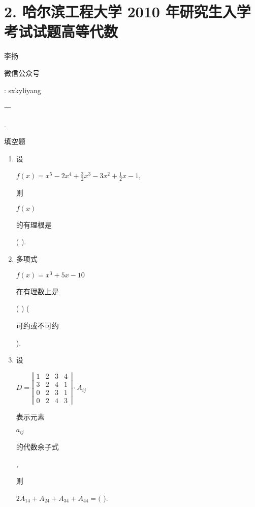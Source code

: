 \documentclass[10pt]{article}
\begin{document}
\section{2. 哈尔滨工程大学 2010 年研究生入学考试试题高等代数}
\begin{CJK}{UTF8}{mj}李扬\end{CJK}

\begin{CJK}{UTF8}{mj}微信公众号\end{CJK}: sxkyliyang

\begin{CJK}{UTF8}{mj}一\end{CJK}. \begin{CJK}{UTF8}{mj}填空题\end{CJK}

\begin{enumerate}
  \item \begin{CJK}{UTF8}{mj}设\end{CJK} $f(x)=x^{5}-2 x^{4}+\frac{3}{2} x^{3}-3 x^{2}+\frac{1}{2} x-1$, \begin{CJK}{UTF8}{mj}则\end{CJK} $f(x)$ \begin{CJK}{UTF8}{mj}的有理根是\end{CJK} ( ).

  \item \begin{CJK}{UTF8}{mj}多项式\end{CJK} $f(x)=x^{3}+5 x-10$ \begin{CJK}{UTF8}{mj}在有理数上是\end{CJK} ( ) (\begin{CJK}{UTF8}{mj}可约或不可约\end{CJK}).

  \item \begin{CJK}{UTF8}{mj}设\end{CJK} $D=\left|\begin{array}{llll}1 & 2 & 3 & 4 \\ 3 & 2 & 4 & 1 \\ 0 & 2 & 3 & 1 \\ 0 & 2 & 4 & 3\end{array}\right| \cdot A_{i j}$ \begin{CJK}{UTF8}{mj}表示元素\end{CJK} $a_{i j}$ \begin{CJK}{UTF8}{mj}的代数余子式\end{CJK}, \begin{CJK}{UTF8}{mj}则\end{CJK} $2 A_{14}+A_{24}+A_{34}+A_{44}=($ ).


\end{enumerate}
\end{document}
